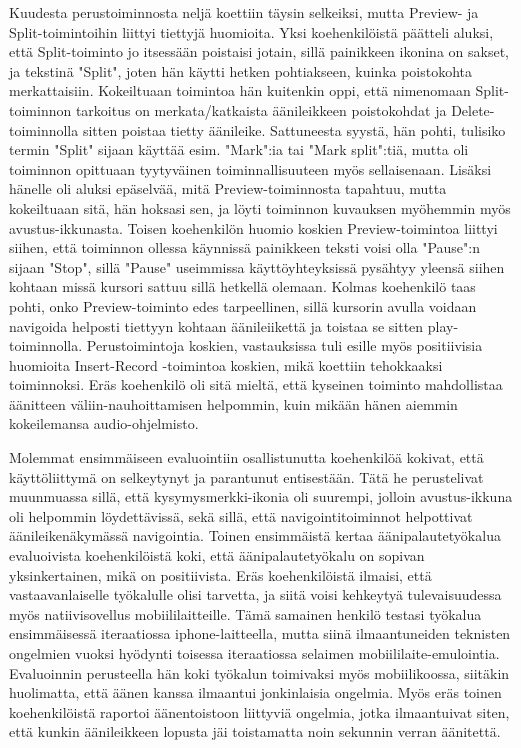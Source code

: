 \documentclass[utf8]{gradu3}
\begin{document}
Kuudesta perustoiminnosta neljä koettiin täysin selkeiksi, mutta Preview- ja Split-toimintoihin liittyi tiettyjä huomioita. Yksi koehenkilöistä päätteli aluksi, että Split-toiminto jo itsessään  poistaisi jotain, sillä painikkeen ikonina on sakset, ja tekstinä "Split", joten hän käytti hetken pohtiakseen, kuinka poistokohta merkattaisiin. Kokeiltuaan toimintoa hän kuitenkin oppi, että nimenomaan Split-toiminnon tarkoitus on merkata/katkaista äänileikkeen poistokohdat ja Delete-toiminnolla sitten poistaa tietty äänileike. Sattuneesta syystä, hän pohti, tulisiko termin "Split" sijaan käyttää esim. "Mark":ia tai "Mark split":tiä, mutta oli toiminnon opittuaan tyytyväinen toiminnallisuuteen myös sellaisenaan. Lisäksi hänelle oli aluksi epäselvää, mitä Preview-toiminnosta tapahtuu, mutta kokeiltuaan sitä, hän hoksasi sen, ja löyti toiminnon kuvauksen myöhemmin myös avustus-ikkunasta. Toisen koehenkilön huomio koskien Preview-toimintoa liittyi siihen, että toiminnon ollessa käynnissä painikkeen teksti voisi olla "Pause":n sijaan "Stop", sillä "Pause" useimmissa käyttöyhteyksissä pysähtyy yleensä siihen kohtaan missä kursori sattuu sillä hetkellä olemaan. Kolmas koehenkilö taas pohti, onko Preview-toiminto edes tarpeellinen, sillä kursorin avulla voidaan navigoida helposti tiettyyn kohtaan äänileiikettä ja toistaa se sitten play-toiminnolla. Perustoimintoja koskien, vastauksissa tuli esille myös positiivisia huomioita Insert-Record -toimintoa koskien, mikä koettiin tehokkaaksi toiminnoksi. Eräs koehenkilö oli sitä mieltä, että kyseinen toiminto mahdollistaa äänitteen väliin-nauhoittamisen helpommin, kuin mikään hänen aiemmin kokeilemansa audio-ohjelmisto.

Molemmat ensimmäiseen evaluointiin osallistunutta koehenkilöä kokivat, että käyttöliittymä on selkeytynyt ja parantunut entisestään. Tätä he perustelivat muunmuassa sillä, että kysymysmerkki-ikonia oli suurempi, jolloin avustus-ikkuna oli helpommin löydettävissä, sekä sillä, että navigointitoiminnot helpottivat äänileikenäkymässä navigointia. Toinen ensimmäistä kertaa äänipalautetyökalua evaluoivista koehenkilöistä koki, että äänipalautetyökalu on sopivan yksinkertainen, mikä on positiivista. Eräs koehenkilöistä ilmaisi, että vastaavanlaiselle työkalulle olisi tarvetta, ja siitä voisi kehkeytyä tulevaisuudessa myös natiivisovellus mobiililaitteille. Tämä samainen henkilö testasi työkalua ensimmäisessä iteraatiossa iphone-laitteella, mutta siinä ilmaantuneiden teknisten ongelmien vuoksi hyödynti toisessa iteraatiossa selaimen mobiililaite-emulointia. Evaluoinnin perusteella hän koki työkalun toimivaksi myös mobiilikoossa, siitäkin huolimatta, että äänen kanssa ilmaantui jonkinlaisia ongelmia. Myös eräs toinen koehenkilöistä raportoi äänentoistoon liittyviä ongelmia, jotka ilmaantuivat siten, että kunkin äänileikkeen lopusta jäi toistamatta noin sekunnin verran äänitettä.
\end{document}
